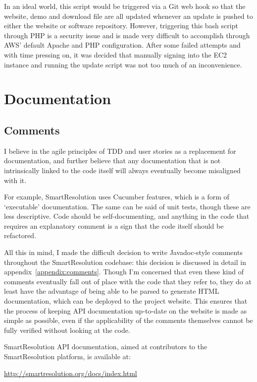 In an ideal world, this script would be triggered via a Git web hook so that the website, demo and download file are all updated whenever an update is pushed to either the website or software repository. However, triggering this bash script through PHP is a security issue and is made very difficult to accomplish through AWS' default Apache and PHP configuration. After some failed attempts and with time pressing on, it was decided that manually signing into the EC2 instance and running the update script was not too much of an inconvenience.

\section{Documentation}

\subsection{Comments}

I believe in the agile principles of TDD and user stories as a replacement for documentation, and further believe that any documentation that is not intrinsically linked to the code itself will always eventually become misaligned with it.

For example, SmartResolution uses Cucumber features, which is a form of `executable' documentation. The same can be said of unit tests, though these are less descriptive. Code should be self-documenting, and anything in the code that requires an explanatory comment is a sign that the code itself should be refactored.

All this in mind, I made the difficult decision to write Javadoc-style comments throughout the SmartResolution codebase: this decision is discussed in detail in appendix~\ref{appendix:comments}. Though I'm concerned that even these kind of comments eventually fall out of place with the code that they refer to, they do at least have the advantage of being able to be parsed to generate HTML documentation, which can be deployed to the project website. This ensures that the process of keeping API documentation up-to-date on the website is made as simple as possible, even if the applicability of the comments themselves cannot be fully verified without looking at the code.

SmartResolution API documentation, aimed at contributors to the SmartResolution platform, is available at:

\url{http://smartresolution.org/docs/index.html}

